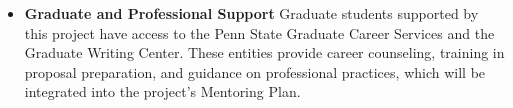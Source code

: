 \documentclass[11pt]{article}
\begin{document}
\begin{itemize}
\item \textbf{Graduate and Professional Support}
Graduate students supported by this project have access to the Penn State Graduate Career Services and the Graduate Writing Center. These entities provide career counseling, training in proposal preparation, and guidance on professional practices, which will be integrated into the project's Mentoring Plan.

\end{itemize}
\end{document}

